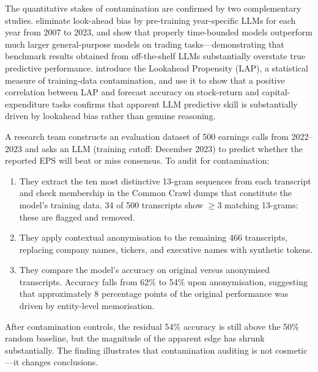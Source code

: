 The quantitative stakes of contamination are confirmed by two complementary studies.
\citet{RahimikiaDrinkall2024} eliminate look-ahead bias by pre-training year-specific
LLMs for each year from 2007 to 2023, and show that properly time-bounded models
outperform much larger general-purpose models on trading tasks---demonstrating that
benchmark results obtained from off-the-shelf LLMs substantially overstate true
predictive performance. \citet{GaoJiangYan2025} introduce the Lookahead Propensity
(LAP), a statistical measure of training-data contamination, and use it to show that
a positive correlation between LAP and forecast accuracy on stock-return and
capital-expenditure tasks confirms that apparent LLM predictive skill is
substantially driven by lookahead bias rather than genuine reasoning.

\begin{example}
\label{ex:ch13-contamination-audit}
A research team constructs an evaluation dataset of 500 earnings calls from 2022--2023
and asks an LLM (training cutoff: December 2023) to predict whether the reported EPS
will beat or miss consensus. To audit for contamination:

\begin{enumerate}
  \item They extract the ten most distinctive 13-gram sequences from each transcript
        and check membership in the Common Crawl dumps that constitute the model's
        training data. 34 of 500 transcripts show $\geq$3 matching 13-grams: these are
        flagged and removed.
  \item They apply contextual anonymisation to the remaining 466 transcripts, replacing
        company names, tickers, and executive names with synthetic tokens.
  \item They compare the model's accuracy on original versus anonymised transcripts.
        Accuracy falls from 62\% to 54\% upon anonymisation, suggesting that
        approximately 8 percentage points of the original performance was driven by
        entity-level memorisation.
\end{enumerate}

After contamination controls, the residual 54\% accuracy is still above the 50\%
random baseline, but the magnitude of the apparent edge has shrunk substantially. The
finding illustrates that contamination auditing is not cosmetic---it changes conclusions.
\end{example}

